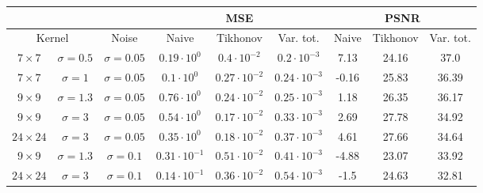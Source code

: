 \documentclass[11pt]{article}
\begin{document}
\begin{center}
    \begin{tabular}{ |cc|c|c|c|c|c|c|c| }
    \hline
    & & & \multicolumn{3}{c|}{MSE} & \multicolumn{3}{c|}{PSNR} \\
    \hline
    \multicolumn{2}{|c|}{Kernel} & Noise & Naive & Tikhonov & Var. tot. & Naive & Tikhonov & Var. tot. \\ 
    \hline
	$7 \times 7$ & $\sigma=0.5$ & $\sigma=0.05$   & $0.19 \cdot 10^{0}$ & $0.4 \cdot 10^{-2}$ & $0.2 \cdot 10^{-3}$ & 7.13 & 24.16 & 37.0 \\
	$7 \times 7$ & $\sigma=1$ & $\sigma=0.05$     & $0.1 \cdot 10^{0}$  & $0.27 \cdot 10^{-2}$ & $0.24 \cdot 10^{-3}$ & -0.16 & 25.83 & 36.39 \\
	$9 \times 9$ & $\sigma=1.3$ & $\sigma=0.05$   & $0.76 \cdot 10^{0}$  & $0.24 \cdot 10^{-2}$ & $0.25 \cdot 10^{-3}$ & 1.18 & 26.35 & 36.17 \\
	$9 \times 9$ & $\sigma=3$ & $\sigma=0.05$   & $0.54 \cdot 10^{0}$  & $0.17 \cdot 10^{-2}$ & $0.33 \cdot 10^{-3}$ & 2.69 & 27.78 & 34.92 \\
	$24 \times 24$ & $\sigma=3$ & $\sigma=0.05$   & $0.35 \cdot 10^{0}$  & $0.18 \cdot 10^{-2}$ & $0.37 \cdot 10^{-3}$ & 4.61 & 27.66 & 34.64 \\
    \hline
	$9 \times 9$ & $\sigma=1.3$ & $\sigma=0.1$   & $0.31 \cdot 10^{-1}$  & $0.51 \cdot 10^{-2}$ & $0.41 \cdot 10^{-3}$ & -4.88 & 23.07 & 33.92 \\
	$24 \times 24$ & $\sigma=3$ & $\sigma=0.1$   & $0.14 \cdot 10^{-1}$  & $0.36 \cdot 10^{-2}$ & $0.54 \cdot 10^{-3}$ & -1.5 & 24.63 & 32.81 \\
    \hline
    \end{tabular}
\end{center}
\end{document}
